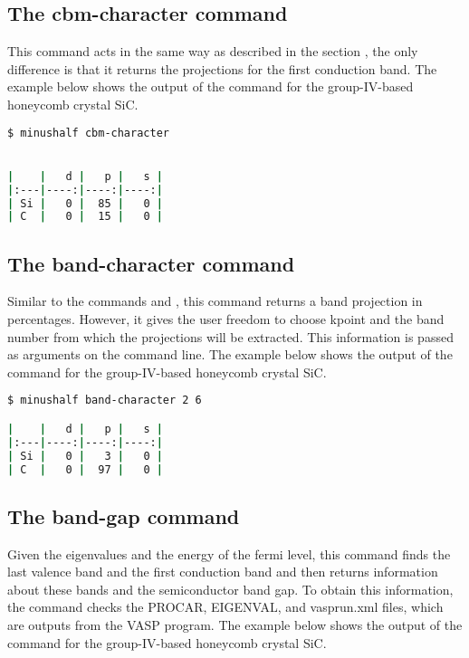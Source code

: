 \subsection{The cbm-character command}
\label{cbm}
This command acts in the same way as described in the section , the only difference is that it returns the projections for the first conduction band. The example below shows the output of the command for the group-IV-based honeycomb crystal SiC.


\begin{lstlisting}[language=bash,caption={Example of the cbm-character for SiC-2D}]
$ minushalf cbm-character


|    |   d |   p |   s |
|:---|----:|----:|----:|
| Si |   0 |  85 |   0 |
| C  |   0 |  15 |   0 |
\end{lstlisting}

\subsection{The band-character command}
\label{cbm}
Similar to the commands  and , this command returns a band projection in percentages. However, it gives the user freedom to choose kpoint and the band number from which the projections will be extracted. This information is passed as arguments on the command line. The example below shows the output of the command for the group-IV-based honeycomb crystal SiC.


\begin{lstlisting}[language=bash,caption={Example of the band-character for SiC-2D}]
$ minushalf band-character 2 6

|    |   d |   p |   s |
|:---|----:|----:|----:|
| Si |   0 |   3 |   0 |
| C  |   0 |  97 |   0 |


\end{lstlisting}

\subsection{The band-gap command}

Given the eigenvalues and the energy of the fermi level, this command finds the last valence band and the first conduction band and then returns information about these bands and the semiconductor band gap. To obtain this information, the command checks the PROCAR, EIGENVAL, and vasprun.xml files, which are outputs from the VASP program. The example below shows the output of the command for the group-IV-based honeycomb crystal SiC.


